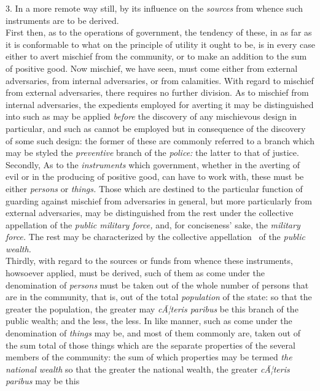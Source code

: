 \documentclass[12pt]{report}
\begin{document}
3. In a more remote way still, by its influence on the \emph{sources}
from whence such instruments are to be derived.\\
First then, as to the operations of government, the tendency of these,
in as far as it is conformable to what on the principle of utility it
ought to be, is in every case either to avert mischief from the
community, or to make an addition to the sum of positive good. Now
mischief, we have seen, must come either from external adversaries, from
internal adversaries, or from calamities. With regard to mischief from
external adversaries, there requires no further division. As to mischief
from internal adversaries, the expedients employed for averting it may
be distinguished into such as may be applied \emph{before} the discovery
of any mischievous design in particular, and such as cannot be employed
but in consequence of the discovery of some such design: the former of
these are commonly referred to a branch which may be styled the
\emph{preventive} branch of the \emph{police:} the latter to that of
justice.\\
Secondly, As to the \emph{instruments} which government, whether in the
averting of evil or in the producing of positive good, can have to work
with, these must be either \emph{persons} or \emph{things.} Those which
are destined to the particular function of guarding against mischief
from adversaries in general, but more particularly from external
adversaries, may be distinguished from the rest under the collective
appellation of the \emph{public military force,} and, for conciseness'
sake, the \emph{military force.} The rest may be characterized by the
collective appellation~ of the \emph{public wealth.}\\
Thirdly, with regard to the sources or funds from whence these
instruments, howsoever applied, must be derived, such of them as come
under the denomination of \emph{persons} must be taken out of the whole
number of persons that are in the community, that is, out of the total
\emph{population} of the state: so that the greater the population, the
greater may \emph{cÃ¦teris paribus} be this branch of the public wealth;
and the less, the less. In like manner, such as come under the
denomination of \emph{things} may be, and most of them commonly are,
taken out of the sum total of those things which are the separate
properties of the several members of the community: the sum of which
properties may be termed \emph{the national wealth} so that the greater
the national wealth, the greater \emph{cÃ¦teris paribus} may be this
\end{document}
